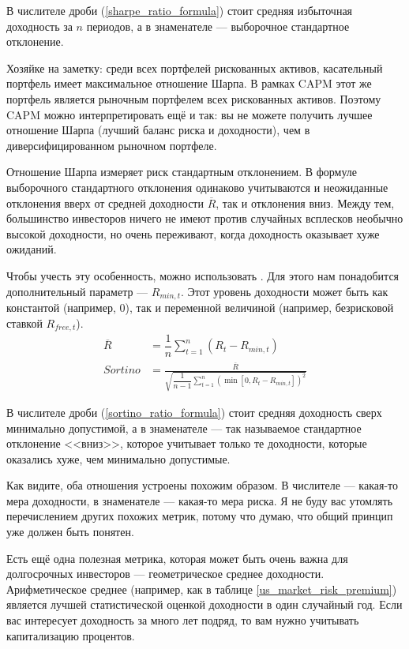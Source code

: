 В числителе дроби (\ref{sharpe_ratio_formula}) стоит средняя избыточная доходность за $n$ периодов, а в знаменателе --- выборочное стандартное отклонение.

Хозяйке на заметку: среди всех портфелей рискованных активов, касательный портфель имеет максимальное отношение Шарпа. В рамках CAPM этот же портфель
является рыночным портфелем всех рискованных активов. Поэтому CAPM можно интерпретировать ещё и так: вы не можете получить лучшее отношение Шарпа (лучший баланс риска и доходности), чем в диверсифицированном рыночном портфеле.

Отношение Шарпа измеряет риск стандартным отклонением. В формуле выборочного стандартного отклонения одинаково учитываются и неожиданные отклонения вверх от средней доходности $\overline{R}$, так и отклонения вниз. Между тем, большинство инвесторов ничего не имеют против случайных всплесков необычно высокой доходности, но очень переживают, когда доходность оказывает хуже ожиданий.

Чтобы учесть эту особенность, можно использовать . Для этого нам понадобится дополнительный параметр ---  $R_{min,t}$. Этот уровень доходности может быть как константой (например, 0), так и переменной величиной (например, безрисковой ставкой $R_{free,t}$).
\begin{align}
\nonumber
\overline{R} &= \dfrac{1}{n}\sum\limits_{t=1}^{n}(R_t - R_{min,t}) \\
Sortino &= \frac
    {\overline{R}}
    {\sqrt{
        \dfrac{1}{n-1} 
        \sum\limits_{t=1}^{n}\left(\min[0, R_t - R_{min,t}]\right)^2
    }}
\label{sortino_ratio_formula}
\end{align}

В числителе дроби (\ref{sortino_ratio_formula}) стоит средняя доходность сверх минимально допустимой, а в знаменателе --- так называемое стандартное отклонение <<вниз>>, которое учитывает только те доходности, которые оказались хуже, чем минимально допустимые.

Как видите, оба отношения устроены похожим образом. В числителе --- какая-то мера доходности, в знаменателе --- какая-то мера риска. Я не буду вас утомлять
перечислением других похожих метрик, потому что думаю, что общий принцип уже
должен быть понятен.

Есть ещё одна полезная метрика, которая может быть очень важна для долгосрочных инвесторов --- геометрическое среднее доходности. Арифметическое среднее (например, как в таблице \ref{us_market_risk_premium}) является лучшей статистической оценкой доходности в один случайный год. Если вас интересует 
доходность за много лет подряд, то вам нужно учитывать капитализацию процентов.


